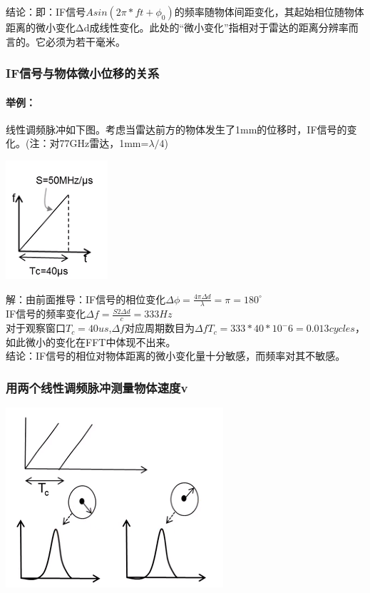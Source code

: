 \documentclass[UTF8]{ctexart}
\begin{document}
结论：即：IF信号$Asin(2\pi*ft+\phi_0)$的频率随物体间距变化，其起始相位随物体距离的微小变化Δd成线性变化。此处的“微小变化”指相对于雷达的距离分辨率而言的。它必须为若干毫米。\\
\subsubsection{IF信号与物体微小位移的关系}
\paragraph{举例：} 
线性调频脉冲如下图。考虑当雷达前方的物体发生了1mm的位移时，IF信号的变化。(注：对77GHz雷达，1mm=$\lambda/4$)

{\centering \includegraphics[width = .3\textwidth]{pic/IFsensitivity.png}

}

解：由前面推导：IF信号的相位变化$\Delta \phi=\frac{4 \pi \Delta d}{\lambda}=\pi=180^\circ$\\
IF信号的频率变化$\Delta f=\frac{S2\Delta d}{c}=333Hz$\\
对于观察窗口$T_c=40us$,$\Delta f$对应周期数目为$\Delta f T_c=333*40*10^-6=0.013 cycles$，如此微小的变化在FFT中体现不出来。\\
结论：IF信号的相位对物体距离的微小变化量十分敏感，而频率对其不敏感。
\subsubsection{用两个线性调频脉冲测量物体速度v}

{\centering \includegraphics[width = .4\textwidth]{pic/speedmes.png}

}
\end{document}
